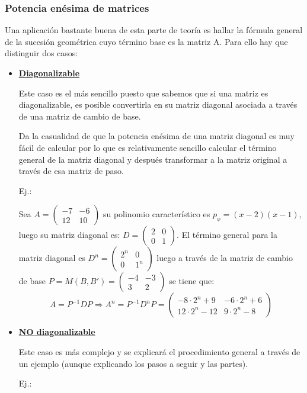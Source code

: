 \documentclass[10pt,a4paper,openright]{book}
\begin{document}
\subsubsection*{Potencia enésima de matrices}
Una aplicación bastante buena de esta parte de teoría es hallar la fórmula general de la sucesión geométrica cuyo término base es la matriz A. Para ello hay que distinguir dos casos:
\begin{itemize}
\item \underline{\textbf{Diagonalizable}}

Este caso es el más sencillo puesto que sabemos que si una matriz es diagonalizable, es posible convertirla en su matriz diagonal asociada a través de una matriz de cambio de base.

Da la casualidad de que la potencia enésima de una matriz diagonal es muy fácil de calcular por lo que es relativamente sencillo calcular el término general de la matriz diagonal y después transformar a la matriz original a través de esa matriz de paso.

Ej.:

Sea $A=\begin{pmatrix}-7&-6\\12&10\end{pmatrix}$ su polinomio característico es $p_\phi=(x-2)(x-1)$, luego su matriz diagonal es:
$D=\begin{pmatrix}2&0\\0&1\end{pmatrix}$. El término general para la matriz diagonal es $D^n=\begin{pmatrix}2^n&0\\0&1^n\end{pmatrix}$ luego a través de la matriz de cambio de base $P=M(B,B')=\begin{pmatrix}
-4&-3\\3&2\end{pmatrix}$ se tiene que:
$$A=P^{-1}DP\Rightarrow A^n=P^{-1}D^nP=\begin{pmatrix}
 -8\cdot 2^n+9&	-6\cdot 2^n+6\\
12\cdot 2^n-12&	 9\cdot 2^n-8
\end{pmatrix}
$$

\item \underline{\textbf{NO diagonalizable}}

Este caso es más complejo y se explicará el procedimiento general a través de un ejemplo (aunque explicando los pasos a seguir y las partes).

Ej.:


\end{itemize}
\end{document}
